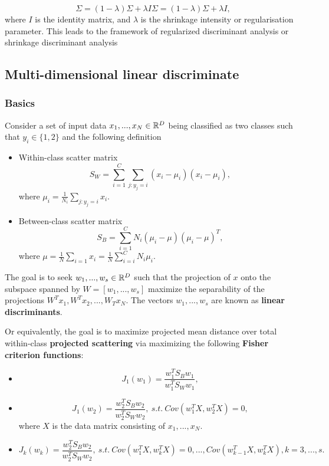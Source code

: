 \begin{refsection}
\begin{remark}
$$\Sigma =(1-\lambda )\Sigma +\lambda I \Sigma =(1-\lambda )\Sigma +\lambda I,$$
where $I$ is the identity matrix, and $ \lambda $ is the shrinkage intensity or regularisation parameter. This leads to the framework of regularized discriminant analysis or shrinkage discriminant analysis	
	
\end{remark}


\subsection{Multi-dimensional linear discriminate}

\subsubsection{Basics}

\begin{definition}\label{ch:statistical-learning:ch:statistical-learning:th:OptimalityConditionFisherCriterionMultiDimensional}\cite[654]{johnson2007applied}
Consider a set of input data $x_1,...,x_N\in \mathbb{R}^D$ being classified as two classes such that $y_i\in \{1,2\}$ and the following definition	
\begin{itemize}
		\item Within-class scatter matrix
	$$S_W = \sum_{i=1}^C \sum_{j:y_j = i} (x_i - \mu_i)(x_i - \mu_i),$$
	where $\mu_i = \frac{1}{N_i}\sum_{j:y_j = i} x_i$.
	\item Between-class scatter matrix
	$$S_B = \sum_{i=1}^C N_i(\mu_i - \mu)(\mu_i - \mu)^T,$$
	where $\mu = \frac{1}{N}\sum_{i=1} x_i = \frac{1}{N}\sum_{i = i}^C N_i\mu_i$.
\end{itemize}


The goal is to seek $w_1,...,w_s\in \mathbb{R}^D$ such that the projection of $x$ onto the subspace spanned by $W=[w_1,...,w_s]$ maximize the separability of the projections $W^Tx_1, W^Tx_2,..., W_Tx_N$. The vectors $w_1,...,w_s$ are known as \textbf{linear discriminants}. 

Or equivalently, the goal is to maximize projected mean distance over total within-class \textbf{projected scattering} via maximizing the following \textbf{Fisher criterion functions}:
\begin{itemize}
	\item $$J_1(w_1) =\frac{w^T_1S_Bw_1}{w^T_1S_Ww_1},$$
	\item $$J_1(w_2) =\frac{w^T_2S_Bw_2}{w^T_2S_Ww_2}, ~s.t.~ Cov(w_1^TX,w_2^TX) = 0 ,$$
	where $X$ is the data matrix consisting of $x_1,...,x_N$.
	\item $$J_k(w_k) =\frac{w^T_2S_Bw_2}{w^T_2S_Ww_2}, ~s.t.~ Cov(w_1^TX,w_k^TX) = 0,...,Cov(w_{k-1}^TX,w_k^TX), k=3,...,s.$$
\end{itemize}
\end{definition}


\end{refsection}
